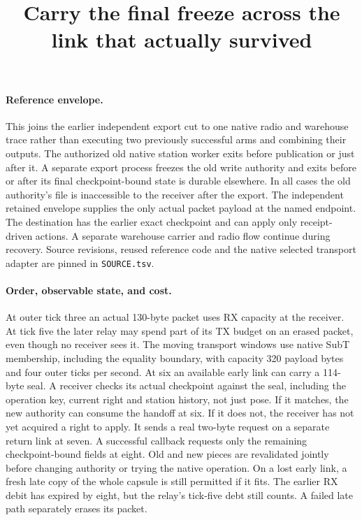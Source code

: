 \documentclass{article}
\title{Carry the final freeze across the link that actually survived}
\date{}
\begin{document}
\maketitle

\paragraph{Reference envelope.}
This joins the earlier independent export cut to one native radio and
warehouse trace rather than executing two previously successful arms
and combining their outputs. The authorized old native station
worker exits before publication or just after it. A separate export
process freezes the old write authority and exits before or after
its final checkpoint-bound state is durable elsewhere. In all cases
the old authority's file is inaccessible to the receiver after
the export. The independent retained envelope supplies the only
actual packet payload at the named endpoint. The destination has
the earlier exact checkpoint and can apply only receipt-driven
actions. A separate warehouse carrier and radio flow continue
during recovery. Source revisions, reused reference code and the
native selected transport adapter are pinned in \verb|SOURCE.tsv|.

\paragraph{Order, observable state, and cost.}
At outer tick three an actual 130-byte packet uses RX capacity at
the receiver. At tick five the later relay may spend part of its
TX budget on an erased packet, even though no receiver sees it.
The moving transport windows use native SubT membership, including
the equality boundary, with capacity 320 payload bytes and four
outer ticks per second. At six an available early link can carry
a 114-byte seal. A receiver checks its actual checkpoint against
the seal, including the operation key, current right and station
history, not just pose. If it matches, the new authority can
consume the handoff at six. If it does not, the receiver has not
yet acquired a right to apply. It sends a real two-byte request on
a separate return link at seven. A successful callback requests
only the remaining checkpoint-bound fields at eight. Old and new
pieces are revalidated jointly before changing authority or trying
the native operation. On a lost early link, a fresh late copy of
the whole capsule is still permitted if it fits. The earlier RX
debit has expired by eight, but the relay's tick-five debt still
counts. A failed late path separately erases its packet.
\end{document}
